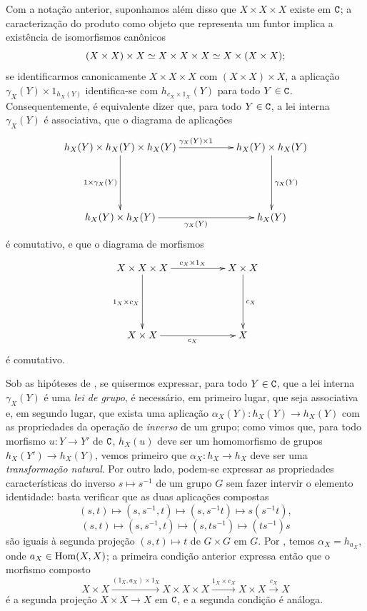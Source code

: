 \begin{env}[8.2.5]
\label{0.8.2.5}
Com a notação anterior, suponhamos além disso que $X\times X\times X$ existe em $\mathtt{C}$; a caracterização do produto como objeto que representa um funtor  implica a existência de isomorfismos canônicos
\[
  (X\times X)\times X\simeq X\times X\times X\simeq X\times(X\times X);
\]
se identificarmos canonicamente $X\times X\times X$ com $(X\times X)\times X$, a aplicação $\gamma_X(Y)\times 1_{h_X(Y)}$ identifica-se com $h_{c_X\times 1_X}(Y)$ para todo $Y\in\mathtt{C}$.
Consequentemente, é equivalente dizer que, para todo $Y\in\mathtt{C}$, a lei interna $\gamma_X(Y)$ é associativa, que o diagrama de aplicações
\[
  \xymatrix{
    h_X(Y)\times h_X(Y)\times h_X(Y)\ar[rr]^{\gamma_X(Y)\times 1}\ar[dd]_{1\times\gamma_X(Y)} & &
    h_X(Y)\times h_X(Y)\ar[dd]^{\gamma_X(Y)}\\\\
    h_X(Y)\times h_X(Y)\ar[rr]_{\gamma_X(Y)} & &
    h_X(Y)
  }
\]
é comutativo, e que o diagrama de morfismos
\[
  \xymatrix{
    X\times X\times X\ar[rr]^{c_X\times 1_X}\ar[dd]_{1_X\times c_X} & &
    X\times X\ar[dd]^{c_X}\\\\
    X\times X\ar[rr]_{c_X} & &
    X
  }
\]
é comutativo.
\end{env}

\begin{env}[8.2.6]
\label{0.8.2.6}
Sob as hipóteses de , se quisermos expressar, para todo $Y\in\mathtt{C}$, que a lei interna $\gamma_X(Y)$ é uma \emph{lei de grupo}, é necessário, em primeiro lugar, que seja associativa e, em segundo lugar, que exista uma aplicação $\alpha_X(Y):h_X(Y)\to h_X(Y)$ com as propriedades da operação de \emph{inverso} de um grupo; como vimos que, para todo morfismo $u:Y\to Y'$ de $\mathtt{C}$, $h_X(u)$ deve ser um homomorfismo de grupos $h_X(Y')\to h_X(Y)$, vemos primeiro que $\alpha_X:h_X\to h_X$ deve ser uma \emph{transformação natural}.
Por outro lado, podem-se expressar as propriedades características do inverso $s\mapsto s^{-1}$ de um grupo $G$ sem fazer intervir o elemento identidade: basta verificar que as duas aplicações compostas
\[
  (s,t)\mapsto(s,s^{-1},t)\mapsto(s,s^{-1}t)\mapsto s(s^{-1}t),
\]
\[
  (s,t)\mapsto(s,s^{-1},t)\mapsto(s,ts^{-1})\mapsto(ts^{-1})s
\]
são iguais à segunda projeção $(s,t)\mapsto t$ de $G\times G$ em $G$.
Por , temos $\alpha_X=h_{a_X}$, onde $a_X\in\operatorname{Hom}(X,X)$; a primeira condição anterior expressa então que o morfismo composto
\[
  X\times X\xrightarrow{(1_X,a_X)\times 1_X}X\times X\times X\xrightarrow{1_X\times c_X}X\times X\xrightarrow{c_X}X
\]
é a segunda projeção $X\times X\to X$ em $\mathtt{C}$, e a segunda condição é análoga.
\end{env}

